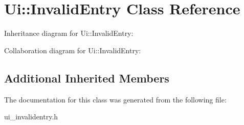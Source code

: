 \section{Ui\+:\+:Invalid\+Entry Class Reference}
\label{class_ui_1_1_invalid_entry}


Inheritance diagram for Ui\+:\+:Invalid\+Entry\+:


Collaboration diagram for Ui\+:\+:Invalid\+Entry\+:
\subsection*{Additional Inherited Members}


The documentation for this class was generated from the following file\+:\begin{DoxyCompactItemize}
\item 
ui\+\_\+invalidentry.\+h\end{DoxyCompactItemize}
